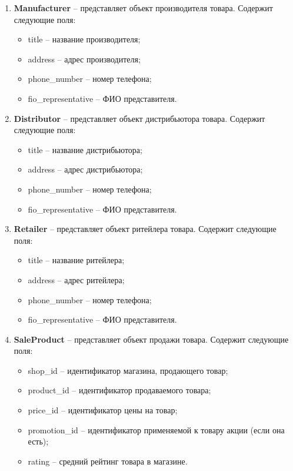 \begin{enumerate}
	\item \textbf{Manufacturer} -- представляет объект производителя товара. Содержит следующие поля: 
	\begin{itemize}
		\item title -- название производителя;
		\item address -- адрес производителя;
		\item phone\_number -- номер телефона;
		\item fio\_representative -- ФИО представителя.
	\end{itemize}
	
	\item \textbf{Distributor} -- представляет объект дистрибьютора товара. Содержит следующие поля: 
	\begin{itemize}
		\item title -- название дистрибьютора;
		\item address -- адрес дистрибьютора;
		\item phone\_number -- номер телефона;
		\item fio\_representative -- ФИО представителя.
	\end{itemize}
	
	\item \textbf{Retailer} -- представляет объект ритейлера товара. Содержит следующие поля: 
	\begin{itemize}
		\item title -- название ритейлера;
		\item address -- адрес ритейлера;
		\item phone\_number -- номер телефона;
		\item fio\_representative -- ФИО представителя.
	\end{itemize}
	
	\item \textbf{SaleProduct} -- представляет объект продажи товара. Содержит следующие поля: 
	\begin{itemize}
		\item shop\_id -- идентификатор магазина, продающего товар;
		\item product\_id -- идентификатор продаваемого товара;
		\item price\_id -- идентификатор цены на товар;
		\item promotion\_id -- идентификатор применяемой к товару акции (если она есть);
		\item rating -- средний рейтинг товара в магазине.
	\end{itemize}
	
\end{enumerate}

